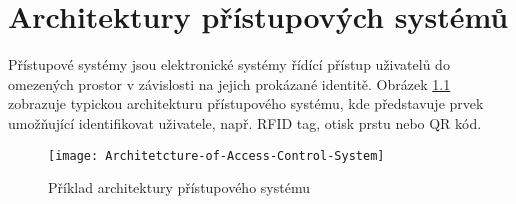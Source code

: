 \chapter{Architektury přístupových systémů}
\DIFdelbegin %

\DIFdelend Přístupové systémy jsou elektronické systémy řídící přístup uživatelů do omezených prostor v závislosti na jejich prokázané identitě.
Obrázek \ref{fig:Access control system architecture} zobrazuje typickou architekturu přístupového systému, kde \DIFdelbegin {}\DIFdelend \DIFaddbegin {}\DIFaddend představuje prvek umožňující identifikovat uživatele, např. RFID tag, otisk prstu nebo QR kód. 

\begin{figure}[!h]
    \centering
    \texttt{[image: Architetcture-of-Access-Control-System]}
    \caption{Příklad architektury přístupového systému \cite{accessControlSystem_eiprocus}}
    \label{fig:Access control system architecture}
\end{figure}

